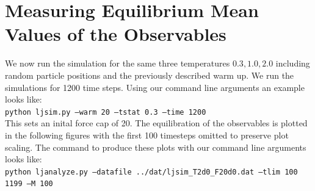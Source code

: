 \section{Measuring Equilibrium Mean Values of the Observables}
We now run the simulation for the same three temperatures ${0.3, 1.0, 2.0}$ including random particle positions and the previously described warm up. We run the simulations for 1200 time steps. Using our command line arguments an example looks like:\\

{\tt python ljsim.py --warm 20 --tstat 0.3 --time 1200}\\

This sets an inital force cap of 20. The equilibration of the observables is plotted in the following figures with the first 100 timesteps omitted to preserve plot scaling. The command to produce these plots with our command line arguments looks like:\\

{\tt python ljanalyze.py --datafile ../dat/ljsim\_T2d0\_F20d0.dat --tlim 100 1199 --M 100}\\

